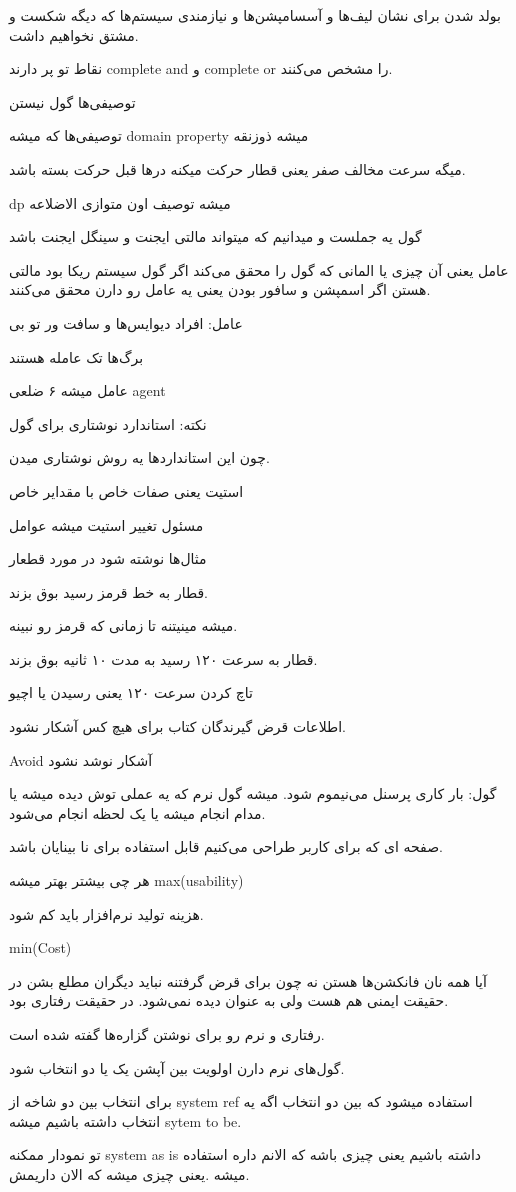 بولد شدن برای نشان لیف‌ها و آسسامپشن‌ها و نیازمندی سیستم‌ها که دیگه شکست و مشتق
نخواهیم داشت.

نقاط تو پر دارند complete and و complete or را مشخص می‌کنند.

توصیفی‌ها گول نیستن

توصیفی‌ها که میشه domain property میشه ذوزنقه

میگه سرعت مخالف صفر یعنی قطار حرکت میکنه در‌ها قبل حرکت بسته باشد.

dp میشه توصیف اون متوازی الاضلاعه

گول یه جملست و میدانیم که میتواند مالتی ایجنت و سینگل ایجنت باشد

عامل یعنی آن چیزی یا المانی که گول را محقق می‌کند
اگر گول سیستم ریکا بود مالتی هستن
اگر اسمپشن و سافور بودن یعنی یه عامل رو دارن محقق می‌کنند.

عامل: افراد دیوایس‌ها و سافت ور تو بی

برگ‌ها تک عامله هستند 

عامل میشه ۶ ضلعی agent

نکته: استاندارد نوشتاری برای گول

چون این استاندارد‌ها یه روش نوشتاری میدن.

استیت یعنی صفات خاص با مقدایر خاص

مسئول تغییر استیت میشه عوامل

مثال‌ها نوشته شود در مورد قطعار

قطار به خط قرمز رسید بوق بزند.

میشه مینیتنه تا زمانی که قرمز رو نبینه.

قطار به سرعت ۱۲۰ رسید به مدت ۱۰ ثانیه بوق بزند.

تاچ کردن سرعت ۱۲۰ یعنی رسیدن یا اچیو

اطلاعات قرض گیرندگان کتاب برای هیچ کس آشکار نشود.

Avoid آشکار نوشد نشود

گول: بار کاری پرسنل می‌نیموم شود. 
میشه گول نرم
که یه عملی توش دیده میشه
یا مدام انجام میشه
یا یک لحظه انجام می‌شود.

صفحه ای که برای کاربر طراحی می‌کنیم قابل استفاده برای نا بینایان باشد.

هر چی بیشتر بهتر میشه max(usability)

هزینه تولید نرم‌افزار باید کم شود.

min(Cost)

آیا همه نان فانکشن‌ها هستن نه
چون برای قرض گرفتنه نباید دیگران مطلع بشن در حقیقت ایمنی هم هست ولی به عنوان
 دیده نمی‌شود. در حقیقت رفتاری بود.

رفتاری و نرم رو برای نوشتن گزاره‌ها گفته شده است.

گول‌های نرم دارن اولویت بین آپشن یک یا دو انتخاب شود.

برای انتخاب بین دو شاخه از system ref استفاده میشود که بین دو انتخاب اگه یه
انتخاب داشته باشیم میشه sytem to be.

تو نمودار ممکنه system as is داشته باشیم یعنی چیزی باشه که الانم داره استفاده
میشه .یعنی چیزی میشه که الان داریمش.

